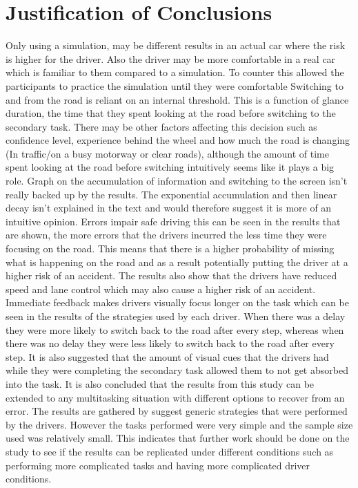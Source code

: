 \documentclass[12pt]{article}
\begin{document}
\section{Justification of Conclusions}
Only using a simulation, may be different results in an actual car where the risk is higher for the driver. Also the driver may be more comfortable in a real car which is familiar to them compared to a simulation. To counter this \cite{Lee} allowed the participants to practice the simulation until they were comfortable
Switching to and from the road is reliant on an internal threshold. This is a function of glance duration, the time that they spent looking at the road before switching to the secondary task. There may be other factors affecting this decision such as confidence level, experience behind the wheel and how much the road is changing (In traffic/on a busy motorway or clear roads), although the amount of time spent looking at the road before switching intuitively seems like it plays a big role. Graph on the accumulation of information and switching to the screen isn't really backed up by the results. The exponential accumulation and then linear decay isn't explained in the text and would therefore suggest it is more of an intuitive opinion.
Errors impair safe driving this can be seen in the results that are shown, the more errors that the drivers incurred the less time they were focusing on the road. This means that there is a higher probability of missing what is happening on the road and as a result potentially putting the driver at a higher risk of an accident. The results also show that the drivers have reduced speed and lane control which may also cause a higher risk of an accident. 
Immediate feedback makes drivers visually focus longer on the task which can be seen in the results of the strategies used by each driver. When there was a delay they were more likely to switch back to the road after every step, whereas when there was no delay they were less likely to switch back to the road after every step. It is also suggested that the amount of visual cues that the drivers had while they were completing the secondary task allowed them to not get absorbed into the task. 
It is also concluded that the results from this study can be extended to any multitasking situation with different options to recover from an error. The results are gathered by \cite{Lee} suggest generic strategies that were performed by the drivers. However the tasks performed were very simple and the sample size used was relatively small. This indicates that further work should be done on the study to see if the results can be replicated under different conditions such as performing more complicated tasks and having more complicated driver conditions. 
\end{document}
